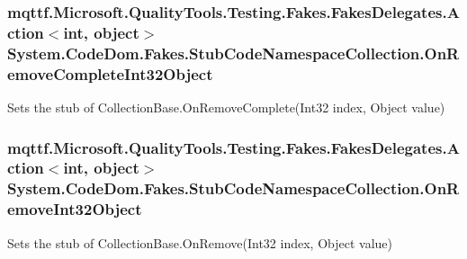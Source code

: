 \hypertarget{class_system_1_1_code_dom_1_1_fakes_1_1_stub_code_namespace_collection_a9535a8673e37112c7a61a0e81606f6ae}{
\subsubsection[{On\-Remove\-Complete\-Int32\-Object}]{\setlength{\rightskip}{0pt plus 5cm}mqttf.\-Microsoft.\-Quality\-Tools.\-Testing.\-Fakes.\-Fakes\-Delegates.\-Action$<$int, object$>$ System.\-Code\-Dom.\-Fakes.\-Stub\-Code\-Namespace\-Collection.\-On\-Remove\-Complete\-Int32\-Object}}\label{class_system_1_1_code_dom_1_1_fakes_1_1_stub_code_namespace_collection_a9535a8673e37112c7a61a0e81606f6ae}


Sets the stub of Collection\-Base.\-On\-Remove\-Complete(\-Int32 index, Object value)

\hypertarget{class_system_1_1_code_dom_1_1_fakes_1_1_stub_code_namespace_collection_a65897108f5b84e3cd29d4880cc66443a}{
\subsubsection[{On\-Remove\-Int32\-Object}]{\setlength{\rightskip}{0pt plus 5cm}mqttf.\-Microsoft.\-Quality\-Tools.\-Testing.\-Fakes.\-Fakes\-Delegates.\-Action$<$int, object$>$ System.\-Code\-Dom.\-Fakes.\-Stub\-Code\-Namespace\-Collection.\-On\-Remove\-Int32\-Object}}\label{class_system_1_1_code_dom_1_1_fakes_1_1_stub_code_namespace_collection_a65897108f5b84e3cd29d4880cc66443a}


Sets the stub of Collection\-Base.\-On\-Remove(\-Int32 index, Object value)

